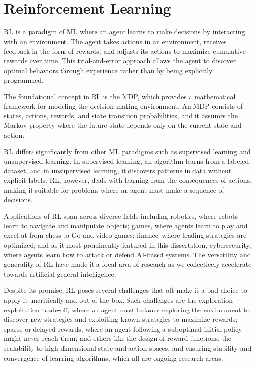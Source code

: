 \section{Reinforcement Learning}

\gls{RL} is a paradigm of \gls{ML} where an agent learns to make decisions by interacting with an environment.
The agent takes actions in an environment, receives feedback in the form of rewards, and adjusts its actions to maximize cumulative rewards over time.
This trial-and-error approach allows the agent to discover optimal behaviors through experience rather than by being explicitly programmed.

The foundational concept in \gls{RL} is the \gls{MDP}, which provides a mathematical framework for modeling the decision-making environment.
An MDP consists of states, actions, rewards, and state transition probabilities, and it assumes the Markov property where the future state depends only on the current state and action.

\gls{RL} differs significantly from other \gls{ML} paradigms such as supervised learning and unsupervised learning.
In supervised learning, an algorithm learns from a labeled dataset, and in unsupervised learning, it discovers patterns in data without explicit labels.
\gls{RL}, however, deals with learning from the consequences of actions, making it suitable for problems where an agent must make a sequence of decisions.

Applications of \gls{RL} span across diverse fields including robotics, where robots learn to navigate and manipulate objects; games, where agents learn to play and excel at from chess to Go and video games; finance, where trading strategies are optimized; and as it most prominently featured in this dissertation, cybersecurity, where agents learn how to attack or defend AI-based systems.
The versatility and generality of \gls{RL} have made it a focal area of research as we collecticely accelerate towards artificial general intelligence.

Despite its promise, \gls{RL} poses several challenges that oft make it a bad choice to apply it uncritically and out-of-the-box.
Such challenges are the exploration-exploitation trade-off, where an agent must balance exploring the environment to discover new strategies and exploiting known strategies to maximize rewards; sparse or delayed rewards, where an agent following a suboptimal initial policy might never reach them; and others like the design of reward functions, the scalability to high-dimensional state and action spaces, and ensuring stability and convergence of learning algorithms, which all are ongoing research areas.

